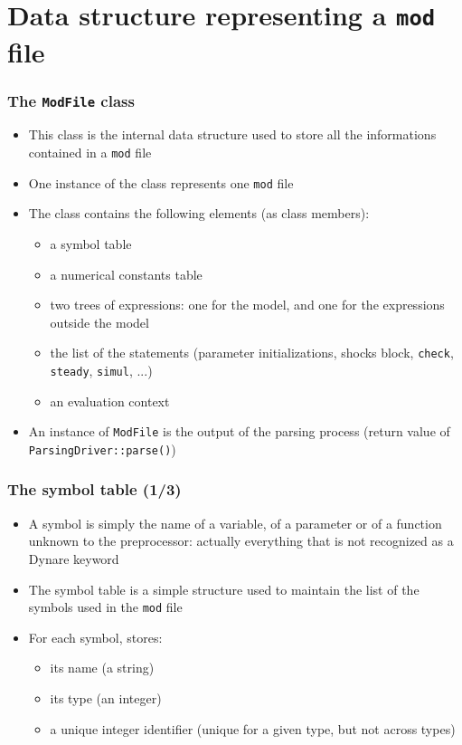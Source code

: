 \documentclass{beamer}
\begin{document}
\section{Data structure representing a \texttt{mod} file}

\begin{frame}
  \frametitle{The \texttt{ModFile} class}
  \begin{itemize}
  \item This class is the internal data structure used to store all the informations contained in a \texttt{mod} file
  \item One instance of the class represents one \texttt{mod} file
  \item The class contains the following elements (as class members):
    \begin{itemize}
    \item a symbol table
    \item a numerical constants table
    \item two trees of expressions: one for the model, and one for the expressions outside the model
    \item the list of the statements (parameter initializations, shocks block, \texttt{check}, \texttt{steady}, \texttt{simul}, ...)
    \item an evaluation context
    \end{itemize}
  \item An instance of \texttt{ModFile} is the output of the parsing process (return value of \texttt{ParsingDriver::parse()})
  \end{itemize}
\end{frame}

\begin{frame}
  \frametitle{The symbol table (1/3)}
  \begin{itemize}
  \item A \alert{symbol} is simply the name of a variable, of a parameter or of a function unknown to the preprocessor: actually everything that is not recognized as a Dynare keyword
  \item The \alert{symbol table} is a simple structure used to maintain the list of the symbols used in the \texttt{mod} file
  \item For each symbol, stores:
    \begin{itemize}
    \item its name (a string)
    \item its type (an integer)
    \item a unique integer identifier (unique for a given type, but not across types)
    \end{itemize}
  \end{itemize}
\end{frame}
\end{document}
